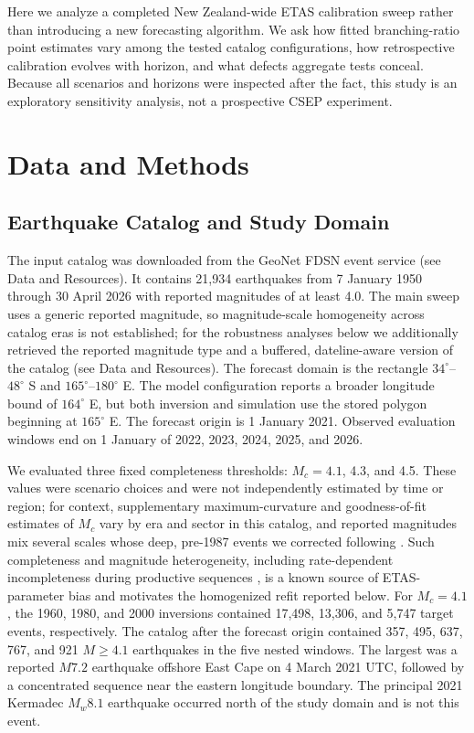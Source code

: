 \documentclass[12pt]{article}
\begin{document}
Here we analyze a completed New Zealand-wide ETAS calibration sweep rather than
introducing a new forecasting algorithm. We ask how fitted branching-ratio
point estimates vary among the tested catalog configurations, how retrospective
calibration evolves with horizon, and what defects aggregate tests conceal.
Because all scenarios and horizons were inspected after the fact, this study is
an exploratory sensitivity analysis, not a prospective CSEP experiment.

\section*{Data and Methods}

\subsection*{Earthquake Catalog and Study Domain}

The input catalog was downloaded from the GeoNet FDSN event service (see Data
and Resources). It contains 21,934 earthquakes from 7 January 1950 through 30
April 2026 with reported magnitudes of at least 4.0. The main sweep uses a
generic reported magnitude, so magnitude-scale homogeneity across catalog eras is
not established; for the robustness analyses below we additionally retrieved the
reported magnitude type and a buffered, dateline-aware version of the catalog (see
Data and Resources). The forecast domain is the
rectangle $34^\circ$--$48^\circ$ S and $165^\circ$--$180^\circ$ E. The model
configuration reports a broader longitude bound of $164^\circ$ E, but both
inversion and simulation use the stored polygon beginning at $165^\circ$ E.
The forecast origin is 1 January 2021. Observed evaluation windows end on 1
January of 2022, 2023, 2024, 2025, and 2026.

We evaluated three fixed completeness thresholds: $M_c=4.1$, 4.3, and 4.5.
These values were scenario choices and were not independently estimated by
time or region; for context, supplementary maximum-curvature and
goodness-of-fit estimates of $M_c$
\citep{Wiemer2000,Woessner2005,Mignan2012} vary by era and sector in this
catalog, and reported magnitudes mix several scales whose deep, pre-1987 events
we corrected following \citet{Zuniga2005}. Such completeness and magnitude
heterogeneity, including rate-dependent incompleteness during productive
sequences \citep{Hainzl2016}, is a known source of ETAS-parameter bias and
motivates the homogenized refit reported below. For $M_c=4.1$, the 1960, 1980,
and 2000 inversions contained 17,498, 13,306, and 5,747 target events,
respectively. The catalog after the forecast
origin contained 357, 495, 637, 767, and 921 $M\geq4.1$ earthquakes in the five
nested windows. The largest was a reported $M7.2$ earthquake offshore East
Cape on 4 March 2021 UTC, followed by a concentrated sequence near the eastern
longitude boundary. The principal 2021 Kermadec $M_w8.1$ earthquake occurred
north of the study domain and is not this event.
\end{document}
